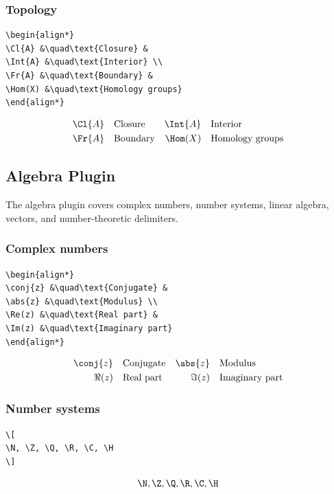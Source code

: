 \documentclass{article}
\begin{document}
\subsubsection*{Topology}
\begin{verbatim}
\begin{align*}
\Cl{A} &\quad\text{Closure} &
\Int{A} &\quad\text{Interior} \\
\Fr{A} &\quad\text{Boundary} &
\Hom(X) &\quad\text{Homology groups}
\end{align*}
\end{verbatim}
\begin{align*}
\Cl{A} &\quad\text{Closure} &
\Int{A} &\quad\text{Interior} \\
\Fr{A} &\quad\text{Boundary} &
\Hom(X) &\quad\text{Homology groups}
\end{align*}

\subsection{Algebra Plugin}

The algebra plugin covers complex numbers, number systems, linear algebra, vectors, and number-theoretic delimiters.

\subsubsection*{Complex numbers}
\begin{verbatim}
\begin{align*}
\conj{z} &\quad\text{Conjugate} &
\abs{z} &\quad\text{Modulus} \\
\Re(z) &\quad\text{Real part} &
\Im(z) &\quad\text{Imaginary part}
\end{align*}
\end{verbatim}
\begin{align*}
\conj{z} &\quad\text{Conjugate} &
\abs{z} &\quad\text{Modulus} \\
\Re(z) &\quad\text{Real part} &
\Im(z) &\quad\text{Imaginary part}
\end{align*}

\subsubsection*{Number systems}
\begin{verbatim}
\[
\N, \Z, \Q, \R, \C, \H
\]
\end{verbatim}
\[
\N, \Z, \Q, \R, \C, \H
\]
\end{document}
